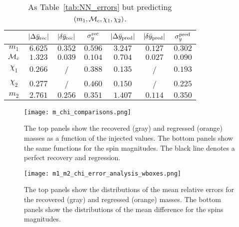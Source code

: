 \begin{table}
  \caption{\label{tab:NN_errors_temp} As Table~\ref{tab:NN_errors} but predicting $(m_1, {\cal{M}}_c, \chi_1, \chi_2)$. }
  \begin{center}
  \begin{tabular}{c|ccc|ccc}
  \hline\hline
  & $|\Delta \bar{y}_{\rm rec}|$  & $|\delta \bar{y}_{\rm rec}|$  & $\sigma_y^{\rm rec}$ & 
     $|\Delta \bar{y}_{\rm pred}|$ & $|\delta \bar{y}_{\rm pred}|$ & $\sigma_y^{\rm pred}$ \\
  \hline\hline
$m_1$          & $6.625$ & $0.352$ & $0.596$ & $3.247$ & $0.127$ & $0.302$ \\
${\cal{M}}_c$  & $1.323$ & $0.039$ & $0.104$ & $0.704$ & $0.027$ & $0.090$ \\
$\chi_1$       & $0.266$ &  /  & $0.388$ & $0.135$ &  /  & $0.193$ \\
$\chi_2$       & $0.277$ &  /  & $0.460$ & $0.150$ &  /  & $0.225$ \\
\hline
$m_2$          & $2.761$ & $0.256$ & $0.351$ & $1.407$ & $0.114$ & $0.350$ \\
  \hline\hline
  \end{tabular}
  \end{center}
\end{table}


\begin{figure}
    \centering
    \texttt{[image: m\_chi\_comparisons.png]}
    \caption{The top panels show the recovered (gray) and regressed (orange)
             masses as a function of the injected values. The bottom panels 
             show the same functions for the spin magnitudes. The black line 
             denotes a perfect recovery and regression.
            }
        \label{m_chi_comparisons}
\end{figure}

\begin{figure}
    \centering
    \texttt{[image: m1\_m2\_chi\_error\_analysis\_wboxes.png]}
    \caption{The top panels show the distributions of the mean relative errors 
            for the recovered (gray) and regressed (orange) masses. The bottom
            panels show the distributions of the mean difference for the spins
            magnitudes.
            }
        \label{m_chi_comparisons}
\end{figure}

